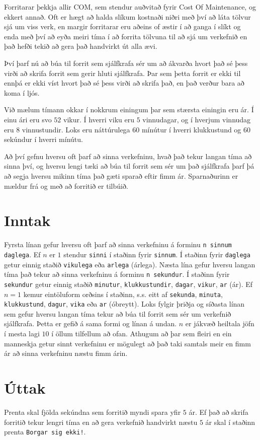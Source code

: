 
Forritarar þekkja allir COM, sem stendur auðvitað fyrir
Cost Of Maintenance, og ekkert annað.
Oft er hægt að halda slíkum kostnaði niðri með því að láta
tölvur sjá um viss verk, en margir forritarar eru aðeins
of æstir í að ganga í slíkt og enda með því að eyða meiri
tíma í að forrita tölvuna til að sjá um verkefnið en það
hefði tekið að gera það handvirkt út alla ævi.

Því þarf nú að búa til forrit sem sjálfkrafa sér um að
ákvarða hvort það sé þess virði að skrifa forrit sem gerir
hluti sjálfkrafa. Þar sem þetta forrit er ekki til ennþá er
ekki víst hvort það sé þess virði að skrifa það, en það verður
bara að koma í ljós.

Við mælum tímann okkar í nokkrum einingum þar sem stærsta
einingin eru ár. Í einu ári eru svo $52$ vikur. Í hverri
viku eru $5$ vinnudagar, og í hverjum vinnudag eru $8$
vinnustundir. Loks eru náttúrulega $60$ mínútur í hverri
klukkustund og $60$ sekúndur í hverri mínútu.

Að því gefnu hversu oft þarf að sinna verkefninu, hvað það
tekur langan tíma að sinna því, og hversu lengi tæki að
búa til forrit sem sér um það sjálfkrafa þarf þá að segja
hversu mikinn tíma það gæti sparað eftir fimm ár. 
Sparnaðurinn er mældur frá og með að forritið er tilbúið.

\section*{Inntak}
Fyrsta línan gefur hversu oft þarf að sinna verkefninu
á forminu \texttt{n sinnum daglega}. Ef $n$ er $1$ stendur
\texttt{sinni} í staðinn fyrir \texttt{sinnum}. Í staðinn
fyrir \texttt{daglega} getur einnig staðið \texttt{vikulega}
eða \texttt{arlega} (árlega).
Næsta lína gefur hversu langan tíma það tekur að sinna
verkefninu á forminu \texttt{n sekundur}. Í staðinn fyrir
\texttt{sekundur} getur einnig staðið \texttt{minutur},
\texttt{klukkustundir}, \texttt{dagar}, \texttt{vikur},
\texttt{ar} (ár). Ef $n = 1$ kemur eintöluform orðsins í
staðinn, s.s. eitt af \texttt{sekunda}, \texttt{minuta},
\texttt{klukkustund}, \texttt{dagur}, \texttt{vika} eða
\texttt{ar} (óbreytt).
Loks fylgir þriðja og síðasta línan sem gefur hversu langan
tíma tekur að búa til forrit sem sér um verkefnið sjálfkrafa.
Þetta er gefið á sama formi og línan á undan.
$n$ er jákvæð heiltala jöfn í mesta lagi $10$ í
öllum tilfellum að ofan.
Athugum að þar sem fleiri en ein manneskja getur sinnt
verkefninu er mögulegt að það taki samtals meir en fimm ár 
að sinna verkefninu næstu fimm árin.

\section*{Úttak}
Prenta skal fjölda sekúndna sem forritið myndi spara yfir $5$
ár. Ef það að skrifa forritið tekur lengri tíma en að gera
verkefnið handvirkt næstu $5$ ár skal í staðinn prenta
\texttt{Borgar sig ekki!}.
